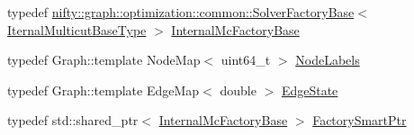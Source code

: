 \begin{DoxyCompactItemize}
\item 
typedef \hyperlink{classnifty_1_1graph_1_1optimization_1_1common_1_1SolverFactoryBase}{nifty\+::graph\+::optimization\+::common\+::\+Solver\+Factory\+Base}$<$ \hyperlink{classnifty_1_1graph_1_1optimization_1_1multicut_1_1PerturbAndMap_a7fc461eff81908dda41de81d703bc895}{Iternal\+Multicut\+Base\+Type} $>$ \hyperlink{classnifty_1_1graph_1_1optimization_1_1multicut_1_1PerturbAndMap_a42f3a2bcecf1f101347aa5f82be67594}{Internal\+Mc\+Factory\+Base}
\item 
typedef Graph\+::template Node\+Map$<$ uint64\+\_\+t $>$ \hyperlink{classnifty_1_1graph_1_1optimization_1_1multicut_1_1PerturbAndMap_a693ef4c90566732057ce860c6215d100}{Node\+Labels}
\item 
typedef Graph\+::template Edge\+Map$<$ double $>$ \hyperlink{classnifty_1_1graph_1_1optimization_1_1multicut_1_1PerturbAndMap_a3ae495ccf80fcc76720dcd7c762eb678}{Edge\+State}
\item 
typedef std\+::shared\+\_\+ptr$<$ \hyperlink{classnifty_1_1graph_1_1optimization_1_1multicut_1_1PerturbAndMap_a42f3a2bcecf1f101347aa5f82be67594}{Internal\+Mc\+Factory\+Base} $>$ \hyperlink{classnifty_1_1graph_1_1optimization_1_1multicut_1_1PerturbAndMap_a71ef6212402b9a6fef9e6f29cd0ba658}{Factory\+Smart\+Ptr}
\end{DoxyCompactItemize}
